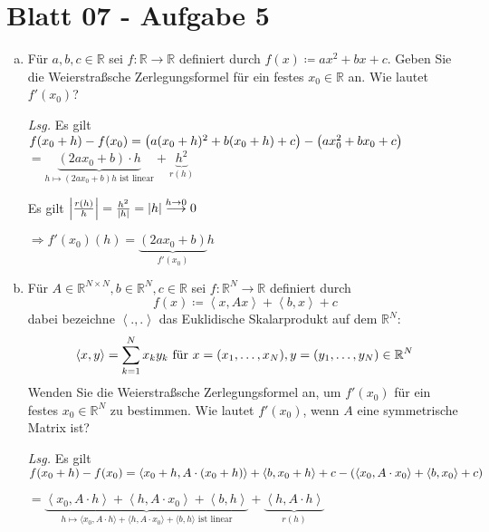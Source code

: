 \documentclass{scrreprt}
\begin{document}
\section{Blatt 07 - Aufgabe 5}

\begin{enumerate}[a)]
\item Für $a, b, c \in \mathbb{R}$ sei $f \colon \mathbb{R} \to \mathbb{R}$
  definiert durch $f(x) \coloneqq ax^2 + bx + c$.
  Geben Sie die Weierstraßsche Zerlegungsformel für ein festes
  $x_0 \in \mathbb{R}$ an.
  Wie lautet $f'(x_0)$?

  \textit{Lsg.}
  Es gilt $f(x_0 + h) - f(x_0) = \qty(a(x_0 + h)^2 + b(x_0 + h) + c)
  - \qty(ax_0^2 + bx_0 + c)$
  $= \underset{h \mapsto (2ax_0 + b)h  \text{ ist linear}}{\underbrace{(2ax_0 + b) \cdot h}} + \underset{r(h)}{\underbrace{h^2}}$

  Es gilt $\abs{\frac{r(h)}{h}} = \frac{h^2}{\abs{h}} = \abs{h} \overset{h \to 0}\longrightarrow 0$

  $\Rightarrow f'(x_0)(h) = \underset{f'(x_0)}{\underbrace{(2ax_0 + b)}} h$

\item Für $A \in \mathbb{R}^{N \times N}, b \in \mathbb{R}^N, c \in \mathbb{R}$ sei
  $f \colon \mathbb{R}^N \to \mathbb{R}$ definiert durch
  \[
    f(x) \coloneqq \left\langle x, Ax \right\rangle + \left\langle b, x \right\rangle + c
  \]
  dabei bezeichne $\left\langle ., . \right\rangle$ das Euklidische Skalarprodukt auf dem $\mathbb{R}^N \colon$
  \[
    \left\langle x, y \right\rangle = \sum_{k = 1}^N x_k y_k \text{ für } x = \qty(x_1, \ldots, x_N), y = \qty(y_1, \ldots, y_N) \in \mathbb{R}^N
  \]
  Wenden Sie die Weierstraßsche Zerlegungsformel an, um $f'(x_0)$ für ein festes
  $x_0 \in \mathbb{R}^N$ zu bestimmen.
  Wie lautet $f'(x_0)$, wenn $A$ eine symmetrische Matrix ist?

  \textit{Lsg.} Es gilt
  $f(x_0 + h) - f(x_0) = \left\langle x_0 + h, A \cdot (x_0 + h) \right\rangle
  + \left\langle b, x_0 + h \right\rangle + c -
  \qty(\left\langle x_0, A \cdot x_0 \right\rangle + \left\langle b, x_0 \right\rangle + c)$

  $= \underset{
    h \mapsto \langle x_0, A \cdot h \rangle + \langle h, A \cdot x_0 \rangle + \langle b, h \rangle \text{ ist linear}
  }{\underbrace{\left\langle x_0, A \cdot h \right\rangle + \left\langle h, A \cdot x_0 \right\rangle
  + \left\langle b, h \right\rangle}} +
  \underset{r(h)}{\underbrace{\left\langle h, A \cdot h \right\rangle}}$


\end{enumerate}
\end{document}

